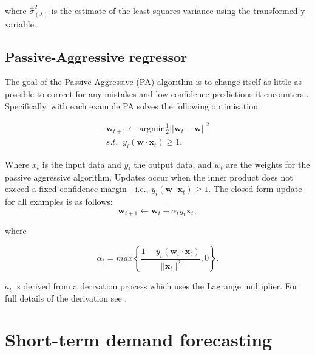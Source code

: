 \noindent where $\hat{\sigma}^2_{(\lambda)}$ is the estimate of the least squares variance using the transformed y variable. 

\subsection{Passive-Aggressive regressor}

The goal of the Passive-Aggressive (PA) algorithm is to change itself as little as possible to correct for any mistakes and low-confidence predictions it encounters \cite{Gzik2014}. Specifically, with each example PA solves the following optimisation \cite{Ma2009}:

\begin{align}
\boldsymbol{w}_{t+1}\leftarrow \text{argmin} \frac{1}{2}\left|\left|{\boldsymbol{w}_t-\boldsymbol{w}}\right|\right|^2 \\
s.t. \; \; y_i(\boldsymbol{w}\cdot \boldsymbol{x}_t)\geq1.
\end{align}

\noindent Where $x_t$ is the input data and $y_i$ the output data, and $w_t$ are the weights for the passive aggressive algorithm. Updates occur when the inner product does not exceed a fixed confidence margin - i.e., $y_i(\boldsymbol{w}\cdot \boldsymbol{x}_t)\geq1$. The closed-form update for all examples is as follows:
\begin{equation}
\boldsymbol{w}_{t+1}\leftarrow \boldsymbol{w}_{t} + \alpha_t y_t \boldsymbol{x}_t,
\end{equation}

\noindent where 

\begin{equation}
\alpha_t=max\left\{\frac{1-y_t(\boldsymbol{w}_t\cdot\boldsymbol{x}_t)}{\left|\left|\boldsymbol{x}_t\right|\right|^2},0\right\}. 	
\end{equation}

\noindent $a_t$ is derived from a derivation process which uses the Lagrange multiplier. For full details of the derivation see \cite{Gzik2014}.














\section{Short-term demand forecasting}
\label{forecast:sec:shortterm}


